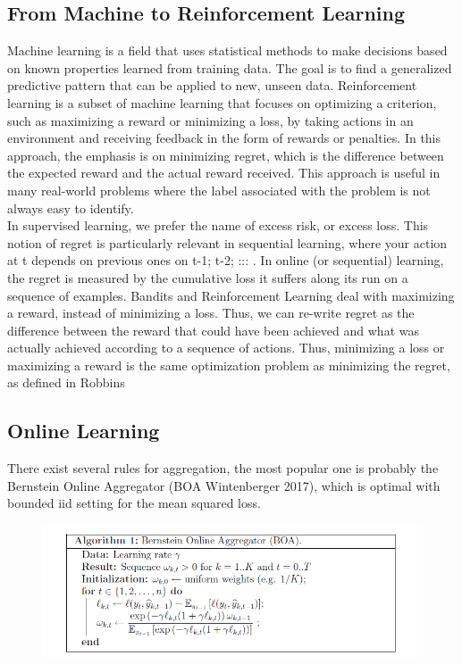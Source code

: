 \documentclass{article}
\begin{document}
\subsection{From Machine to Reinforcement Learning}
Machine learning is a field that uses statistical methods to make decisions based on known properties learned from training data. The goal is to find a generalized predictive pattern that can be applied to new, unseen data. Reinforcement learning is a subset of machine learning that focuses on optimizing a criterion, such as maximizing a reward or minimizing a loss, by taking actions in an environment and receiving feedback in the form of rewards or penalties. In this approach, the emphasis is on minimizing regret, which is the difference between the expected reward and the actual reward received. This approach is useful in many real-world problems where the label associated with the problem is not always easy to identify.\\
In supervised learning, we prefer the name of excess risk, or excess loss. This notion of regret is particularly relevant in sequential learning, where your action at t depends on previous ones on t-1; t-2; ::: . In online (or sequential) learning, the regret is measured by the cumulative loss it suffers along its run on a sequence of examples.
Bandits and Reinforcement Learning deal with maximizing a reward, instead of minimizing a loss. Thus, we can re-write regret as the difference between the reward that could have been achieved and what was actually achieved according to a sequence of actions. Thus, minimizing a loss or maximizing a reward is the same optimization problem as minimizing the regret, as defined in Robbins

\subsection{Online Learning}
There exist several rules for aggregation, the most popular one is probably the Bernstein Online Aggregator (BOA Wintenberger 2017), which is optimal with bounded iid setting for the mean squared loss.
\begin{figure}[H]
\begin{center}
\includegraphics[scale = 0.5]{Algo.png}
\end{center}
\end{figure}
\end{document}
